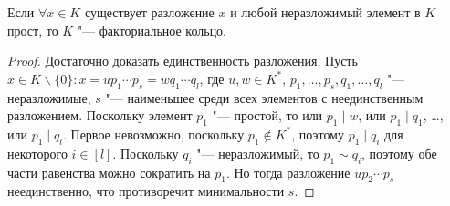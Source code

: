 \begin{proposition}
	Если $\forall x \in K$ существует разложение $x$ и любой неразложимый элемент в $K$ прост, то $K$ "--- факториальное кольцо.
\end{proposition}

\begin{proof}
	Достаточно доказать единственность разложения. Пусть $x \in K\backslash\{0\}: x = up_1\dotsm p_s = wq_1\dotsm q_l$, где $u, w \in K^*$, $p_1, \dotsc, p_s, q_1, \dotsc, q_l$ "--- неразложимые, $s$ "--- наименьшее среди всех элементов с неединственным разложением. Поскольку элемент $p_1$ "--- простой, то или $p_1\mid w$, или $p_1 \mid q_1$, \dots, или $p_1 \mid q_l$. Первое невозможно, поскольку $p_1 \not\in K^*$, поэтому $p_1 \mid q_i$ для некоторого $i \in [l]$. Поскольку $q_i$ "--- неразложимый, то $p_1 \sim q_i$, поэтому обе части равенства можно сократить на $p_1$. Но тогда разложение $up_2\dotsm p_s$ неединственно, что противоречит минимальности $s$.
\end{proof}